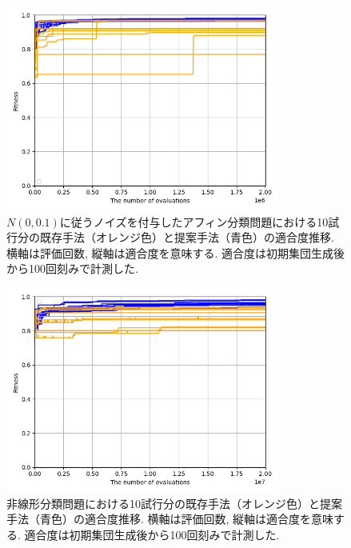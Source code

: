 \documentclass[11pt,oneside,openany,report]{jsbook}
\begin{document}
\begin{figure}[H]
  \centering
  \includegraphics[width=9cm]{exp/noisy_affine_classification.png}
  \caption{$N(0,0.1)$に従うノイズを付与したアフィン分類問題における10試行分の既存手法（オレンジ色）と提案手法（青色）の適合度推移. 横軸は評価回数, 縦軸は適合度を意味する. 適合度は初期集団生成後から100回刻みで計測した.}
  \label{fig:exp:result:noisy_affine_classification}
\end{figure}

\begin{figure}[H]
  \centering
  \includegraphics[width=9cm]{exp/two_layers_nn_classification.png}
  \caption{非線形分類問題における10試行分の既存手法（オレンジ色）と提案手法（青色）の適合度推移. 横軸は評価回数, 縦軸は適合度を意味する. 適合度は初期集団生成後から100回刻みで計測した.}
  \label{fig:exp:result:two_layers_nn_classification}
\end{figure}
\end{document}
